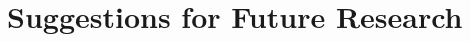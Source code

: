 \documentclass[MasterThesisMain.tex]{subfiles}
\begin{document}
\chapter{Suggestions for Future Research}
\end{document}
